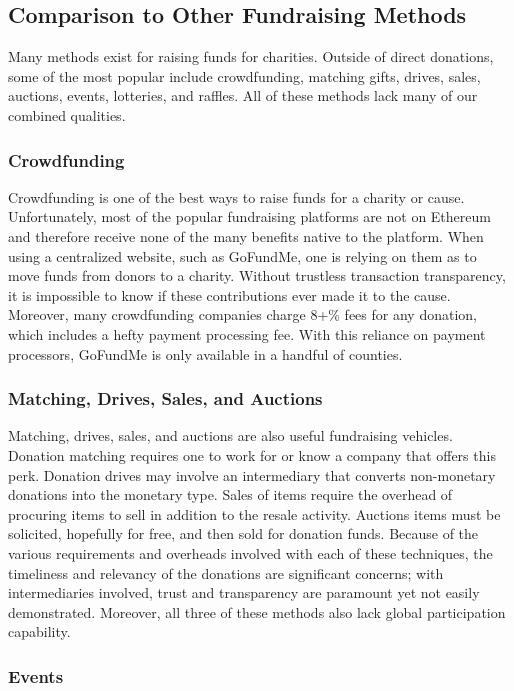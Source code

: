 \documentclass[11pt]{article}
\begin{document}
\subsection{Comparison to Other Fundraising Methods}

Many methods exist for raising funds for charities. Outside of direct donations, some of the most popular include crowdfunding, matching gifts, drives, sales, auctions, events, lotteries, and raffles. All of these methods lack many of our combined qualities.

\subsubsection{Crowdfunding}

Crowdfunding is one of the best ways to raise funds for a charity or cause. Unfortunately, most of the popular fundraising platforms are not on Ethereum and therefore receive none of the many benefits native to the platform. When using a centralized website, such as GoFundMe, one is relying on them as to move funds from donors to a charity. Without trustless transaction transparency, it is impossible to know if these contributions ever made it to the cause. Moreover, many crowdfunding companies charge 8+\% fees for any donation, which includes a hefty payment processing fee. With this reliance on payment processors, GoFundMe is only available in a handful of counties.

\subsubsection{Matching, Drives, Sales, and Auctions}

Matching, drives, sales, and auctions are also useful fundraising vehicles. Donation matching requires one to work for or know a company that offers this perk. Donation drives may involve an intermediary that converts non-monetary donations into the monetary type. Sales of items require the overhead of procuring items to sell in addition to the resale activity. Auctions items must be solicited, hopefully for free, and then sold for donation funds. Because of the various requirements and overheads involved with each of these techniques, the timeliness and relevancy of the donations are significant concerns; with intermediaries involved, trust and transparency are paramount yet not easily demonstrated. Moreover, all three of these methods also lack global participation capability.

\subsubsection{Events}
\end{document}
